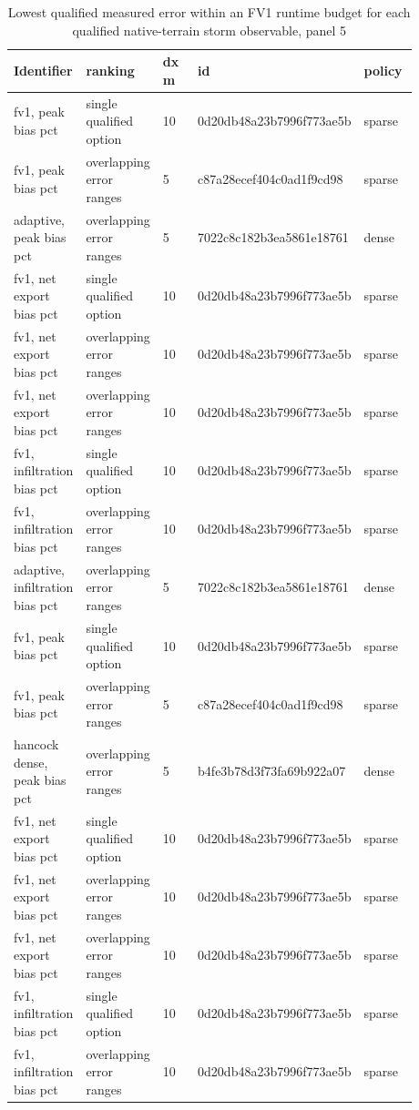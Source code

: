 \begin{longtable}{p{0.1760\linewidth}p{0.1760\linewidth}p{0.1760\linewidth}p{0.1760\linewidth}p{0.1760\linewidth}}
\caption{Lowest qualified measured error within an FV1 runtime budget for each qualified native-terrain storm observable, panel 5}\\
\hline
Identifier & ranking & dx m & id & policy \\
\hline\endhead
fv1, peak bias pct & single qualified option & 10 & 0d20db48a23b7996f773ae5b & sparse \\
fv1, peak bias pct & overlapping error ranges & 5 & c87a28ecef404c0ad1f9cd98 & sparse \\
adaptive, peak bias pct & overlapping error ranges & 5 & 7022c8c182b3ea5861e18761 & dense \\
fv1, net export bias pct & single qualified option & 10 & 0d20db48a23b7996f773ae5b & sparse \\
fv1, net export bias pct & overlapping error ranges & 10 & 0d20db48a23b7996f773ae5b & sparse \\
fv1, net export bias pct & overlapping error ranges & 10 & 0d20db48a23b7996f773ae5b & sparse \\
fv1, infiltration bias pct & single qualified option & 10 & 0d20db48a23b7996f773ae5b & sparse \\
fv1, infiltration bias pct & overlapping error ranges & 10 & 0d20db48a23b7996f773ae5b & sparse \\
adaptive, infiltration bias pct & overlapping error ranges & 5 & 7022c8c182b3ea5861e18761 & dense \\
fv1, peak bias pct & single qualified option & 10 & 0d20db48a23b7996f773ae5b & sparse \\
fv1, peak bias pct & overlapping error ranges & 5 & c87a28ecef404c0ad1f9cd98 & sparse \\
hancock dense, peak bias pct & overlapping error ranges & 5 & b4fe3b78d3f73fa69b922a07 & dense \\
fv1, net export bias pct & single qualified option & 10 & 0d20db48a23b7996f773ae5b & sparse \\
fv1, net export bias pct & overlapping error ranges & 10 & 0d20db48a23b7996f773ae5b & sparse \\
fv1, net export bias pct & overlapping error ranges & 10 & 0d20db48a23b7996f773ae5b & sparse \\
fv1, infiltration bias pct & single qualified option & 10 & 0d20db48a23b7996f773ae5b & sparse \\
fv1, infiltration bias pct & overlapping error ranges & 10 & 0d20db48a23b7996f773ae5b & sparse \\

\end{longtable}
